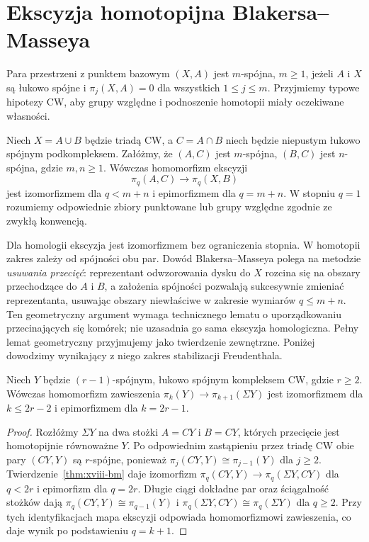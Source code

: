 \section{Ekscyzja homotopijna Blakersa--Masseya}
\begin{definicja}
Para przestrzeni z punktem bazowym $(X,A)$ jest $m$-spójna,
$m\ge1$, jeżeli $A$ i $X$ są łukowo spójne i
$\pi_j(X,A)=0$ dla wszystkich $1\le j\le m$.
Przyjmiemy typowe hipotezy CW, aby grupy względne i
podnoszenie homotopii miały oczekiwane własności.
\end{definicja}
\begin{twierdzenie}
\label{thm:xviii-bm}
Niech $X=A\cup B$ będzie triadą CW, a $C=A\cap B$ niech
będzie niepustym łukowo spójnym podkompleksem.
Załóżmy, że $(A,C)$ jest $m$-spójna, $(B,C)$ jest
$n$-spójna, gdzie $m,n\ge1$.
Wówczas homomorfizm ekscyzji
\[
\pi_q(A,C)\longrightarrow\pi_q(X,B)
\]
jest izomorfizmem dla $q<m+n$ i epimorfizmem dla $q=m+n$.
W stopniu $q=1$ rozumiemy odpowiednie zbiory punktowane
lub grupy względne zgodnie ze zwykłą konwencją.
\end{twierdzenie}
\begin{uwaga}
Dla homologii ekscyzja jest izomorfizmem bez ograniczenia
stopnia. W homotopii zakres zależy od spójności obu par.
Dowód Blakersa--Masseya polega na metodzie \emph{usuwania
przecięć}: reprezentant odwzorowania dysku do $X$ rozcina
się na obszary przechodzące do $A$ i $B$, a założenia
spójności pozwalają sukcesywnie zmieniać reprezentanta,
usuwając obszary niewłaściwe w zakresie wymiarów
$q\le m+n$. Ten geometryczny argument wymaga
technicznego lematu o uporządkowaniu przecinających się
komórek; nie uzasadnia go sama ekscyzja homologiczna.
Pełny lemat geometryczny przyjmujemy jako twierdzenie
zewnętrzne. Poniżej dowodzimy wynikający z niego
zakres stabilizacji Freudenthala.
\end{uwaga}
\begin{wniosek}
\label{cor:xviii-freudenthal}
Niech $Y$ będzie $(r-1)$-spójnym, łukowo spójnym
kompleksem CW, gdzie $r\ge2$. Wówczas homomorfizm
zawieszenia
$\pi_k(Y)\to\pi_{k+1}(\Sigma Y)$ jest izomorfizmem
dla $k\le2r-2$ i epimorfizmem dla $k=2r-1$.
\end{wniosek}
\begin{proof}
Rozłóżmy $\Sigma Y$ na dwa stożki $A=CY$ i $B=CY$,
których przecięcie jest homotopijnie równoważne $Y$.
Po odpowiednim zastąpieniu przez triadę CW
obie pary $(CY,Y)$ są $r$-spójne, ponieważ
$\pi_j(CY,Y)\cong\pi_{j-1}(Y)$ dla $j\ge2$.
Twierdzenie~\ref{thm:xviii-bm} daje izomorfizm
$\pi_q(CY,Y)\to\pi_q(\Sigma Y,CY)$ dla $q<2r$
i epimorfizm dla $q=2r$.
Długie ciągi dokładne par oraz ściągalność stożków
dają $\pi_q(CY,Y)\cong\pi_{q-1}(Y)$ i
$\pi_q(\Sigma Y,CY)\cong\pi_q(\Sigma Y)$ dla $q\ge2$.
Przy tych identyfikacjach mapa ekscyzji odpowiada
homomorfizmowi zawieszenia, co daje wynik po podstawieniu
$q=k+1$.
\end{proof}
